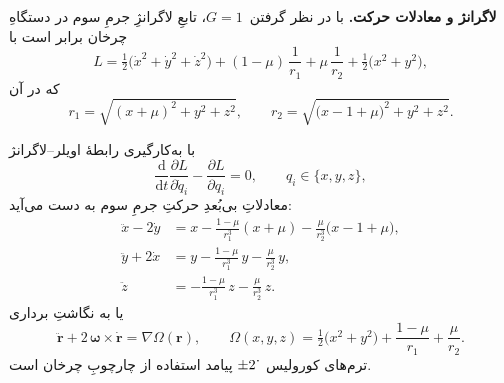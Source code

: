 \textbf{لاگرانژ و معادلات حرکت.} با در نظر گرفتن~$G=1$، تابعِ لاگرانژِ جرمِ سوم در دستگاهِ چرخان برابر است با\cite{vallado2001fundamentals}
\begin{equation}\label{eq:L_crtbp}
	L=\tfrac12\bigl(\dot x^{2}+\dot y^{2}+\dot z^{2}\bigr)
	+(1-\mu)\,\frac{1}{r_{1}}+\mu\,\frac{1}{r_{2}}
	+\tfrac12\bigl(x^{2}+y^{2}\bigr),
\end{equation}
که در آن
\begin{equation}
	r_{1}=\sqrt{(x+\mu)^{2}+y^{2}+z^{2}},\qquad
	r_{2}=\sqrt{\bigl(x-1+\mu\bigr)^{2}+y^{2}+z^{2}}.
\end{equation}

با به‌کارگیری رابطهٔ اویلر–لاگرانژ
\begin{equation*}
	\frac{\mathrm d}{\mathrm dt}\frac{\partial L}{\partial \dot q_{i}}-
	\frac{\partial L}{\partial q_{i}}=0,\qquad q_{i}\in\{x,y,z\},
\end{equation*}
معادلاتِ بی‌بُعدِ حرکتِ جرمِ سوم به دست می‌آید:
\begin{align}
	\ddot x-2\dot y &=
	x-\frac{1-\mu}{r_{1}^{3}}(x+\mu)-\frac{\mu}{r_{2}^{3}}\bigl(x-1+\mu\bigr),\\[2pt]
	\ddot y+2\dot x &=
	y-\frac{1-\mu}{r_{1}^{3}}\,y-\frac{\mu}{r_{2}^{3}}\,y,\\[2pt]
	\ddot z &= -\frac{1-\mu}{r_{1}^{3}}\,z-\frac{\mu}{r_{2}^{3}}\,z.
\end{align}
یا به نگاشتِ برداری
\begin{equation}
	\ddot{\mathbf r}+2\,\boldsymbol\omega\times\dot{\mathbf r}=\nabla\Omega(\mathbf r),\qquad
	\Omega(x,y,z)=\tfrac12\bigl(x^{2}+y^{2}\bigr)+\frac{1-\mu}{r_{1}}+\frac{\mu}{r_{2}}.
\end{equation}
ترم‌های کورولیس~$\pm2\,\dot{\vphantom y}$ پیامد استفاده از چارچوبِ چرخان است.
